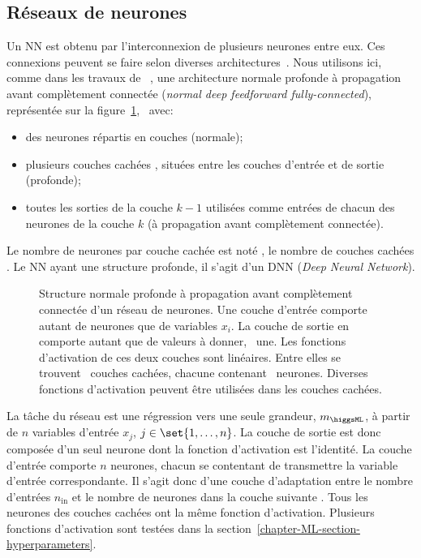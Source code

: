 \subsection{Réseaux de neurones}\label{chapter-ML-section-DNN-networks}
Un NN est obtenu par l'interconnexion de plusieurs neurones entre eux.
Ces connexions peuvent se faire selon diverses architectures~\cite{Sarle1994NeuralNA,DNN}.
Nous utilisons ici,
comme dans les travaux de \citeauthor{BARTSCHI201929}~\cite{BARTSCHI201929},
une architecture
normale profonde à propagation avant complètement connectée (\emph{normal deep feedforward fully-connected}),
représentée sur la figure~\ref{fig-neural_network_fr},
\ie\ avec:
\begin{itemize}
\item des neurones répartis en couches (normale);
\item plusieurs couches \og cachées \fg, situées entre les couches d'entrée et de sortie (profonde);
\item toutes les sorties de la couche $k-1$ utilisées comme entrées de chacun des neurones de la couche $k$ (à propagation avant complètement connectée).
\end{itemize}
Le nombre de neurones par couche cachée est noté \NNeurons,
le nombre de couches cachées \NLayers.
Le NN ayant une structure profonde, il s'agit d'un DNN (\emph{Deep Neural Network}).
\begin{figure}[h]
\centering

\caption[Structure d'un réseau de neurones.]{Structure normale profonde à propagation avant complètement connectée d'un réseau de neurones. Une couche d'entrée comporte autant de neurones que de variables $x_i$. La couche de sortie en comporte autant que de valeurs à donner, \ie\ une. Les fonctions d'activation de ces deux couches sont linéaires. Entre elles se trouvent \NLayers\ couches cachées, chacune contenant \NNeurons\ neurones. Diverses fonctions d'activation peuvent être utilisées dans les couches cachées.}
\label{fig-neural_network_fr}
\end{figure}
\par
La tâche du réseau est une régression vers une seule grandeur, $m_{\higgsML}$, à partir de $n$ variables d'entrée $x_j$, $j\in\set{1,\ldots,n}$.
La couche de sortie est donc composée d'un seul neurone dont la fonction d'activation est l'identité.
La couche d'entrée comporte $n$ neurones, chacun se contentant de transmettre la variable d'entrée correspondante.
Il s'agit donc d'une couche d'adaptation entre le nombre d'entrées $n_\text{in}$ et le nombre de neurones dans la couche suivante \NNeurons.
Tous les neurones des couches cachées ont la même fonction d'activation.
Plusieurs fonctions d'activation sont testées dans la section~\ref{chapter-ML-section-hyperparameters}.